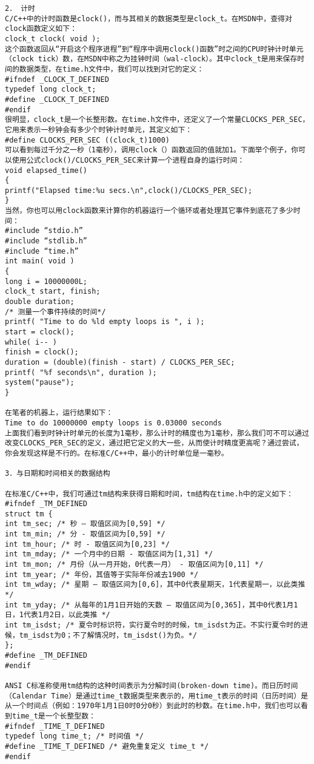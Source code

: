 \begin{verbatim}
2． 计时 
C/C++中的计时函数是clock()，而与其相关的数据类型是clock_t。在MSDN中，查得对clock函数定义如下： 
clock_t clock( void ); 
这个函数返回从“开启这个程序进程”到“程序中调用clock()函数”时之间的CPU时钟计时单元（clock tick）数，在MSDN中称之为挂钟时间（wal-clock）。其中clock_t是用来保存时间的数据类型，在time.h文件中，我们可以找到对它的定义： 
#ifndef _CLOCK_T_DEFINED 
typedef long clock_t; 
#define _CLOCK_T_DEFINED 
#endif 
很明显，clock_t是一个长整形数。在time.h文件中，还定义了一个常量CLOCKS_PER_SEC，它用来表示一秒钟会有多少个时钟计时单元，其定义如下： 
#define CLOCKS_PER_SEC ((clock_t)1000) 
可以看到每过千分之一秒（1毫秒），调用clock（）函数返回的值就加1。下面举个例子，你可以使用公式clock()/CLOCKS_PER_SEC来计算一个进程自身的运行时间： 
void elapsed_time() 
{ 
printf("Elapsed time:%u secs.\n",clock()/CLOCKS_PER_SEC); 
} 
当然，你也可以用clock函数来计算你的机器运行一个循环或者处理其它事件到底花了多少时间： 
#include “stdio.h” 
#include “stdlib.h” 
#include “time.h” 
int main( void ) 
{ 
long i = 10000000L; 
clock_t start, finish; 
double duration; 
/* 测量一个事件持续的时间*/ 
printf( "Time to do %ld empty loops is ", i ); 
start = clock(); 
while( i-- ) 
finish = clock(); 
duration = (double)(finish - start) / CLOCKS_PER_SEC; 
printf( "%f seconds\n", duration ); 
system("pause"); 
} 

在笔者的机器上，运行结果如下： 
Time to do 10000000 empty loops is 0.03000 seconds 
上面我们看到时钟计时单元的长度为1毫秒，那么计时的精度也为1毫秒，那么我们可不可以通过改变CLOCKS_PER_SEC的定义，通过把它定义的大一些，从而使计时精度更高呢？通过尝试，你会发现这样是不行的。在标准C/C++中，最小的计时单位是一毫秒。 

3．与日期和时间相关的数据结构 

在标准C/C++中，我们可通过tm结构来获得日期和时间，tm结构在time.h中的定义如下： 
#ifndef _TM_DEFINED 
struct tm { 
int tm_sec; /* 秒 – 取值区间为[0,59] */ 
int tm_min; /* 分 - 取值区间为[0,59] */ 
int tm_hour; /* 时 - 取值区间为[0,23] */ 
int tm_mday; /* 一个月中的日期 - 取值区间为[1,31] */ 
int tm_mon; /* 月份（从一月开始，0代表一月） - 取值区间为[0,11] */ 
int tm_year; /* 年份，其值等于实际年份减去1900 */ 
int tm_wday; /* 星期 – 取值区间为[0,6]，其中0代表星期天，1代表星期一，以此类推 */
int tm_yday; /* 从每年的1月1日开始的天数 – 取值区间为[0,365]，其中0代表1月1日，1代表1月2日，以此类推 */ 
int tm_isdst; /* 夏令时标识符，实行夏令时的时候，tm_isdst为正。不实行夏令时的进候，tm_isdst为0；不了解情况时，tm_isdst()为负。*/ 
}; 
#define _TM_DEFINED 
#endif 

ANSI C标准称使用tm结构的这种时间表示为分解时间(broken-down time)。而日历时间（Calendar Time）是通过time_t数据类型来表示的，用time_t表示的时间（日历时间）是从一个时间点（例如：1970年1月1日0时0分0秒）到此时的秒数。在time.h中，我们也可以看到time_t是一个长整型数： 
#ifndef _TIME_T_DEFINED 
typedef long time_t; /* 时间值 */ 
#define _TIME_T_DEFINED /* 避免重复定义 time_t */ 
#endif 


\end{verbatim}
